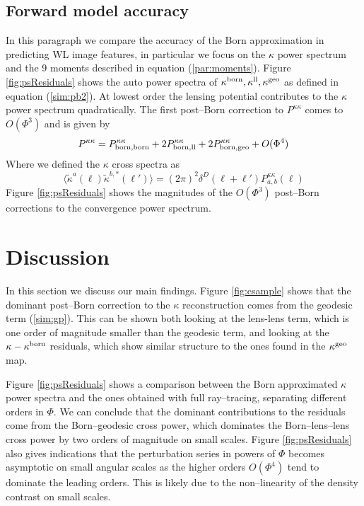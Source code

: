\documentclass[reprint,aps,prd,superscriptaddress,showkeys,showpacs]{revtex4-1}
\begin{document}
\subsection{Forward model accuracy}

In this paragraph we compare the accuracy of the Born approximation in predicting WL image features, in particular we focus on the $\kappa$ power spectrum and the 9 moments described in equation (\ref{par:moments}). Figure \ref{fig:psResiduals} shows the auto power spectra of $\kappa^{\rm born},\kappa^{\rm ll},\kappa^{\rm geo}$ as defined in equation (\ref{sim:pb2}). At lowest order the lensing potential contributes to the $\kappa$ power spectrum quadratically. The first post--Born correction to $P^{\kappa\kappa}$ comes to $O(\Phi^3)$ and is given by
\begin{equation}
\label{res:powercorr}
P^{\kappa\kappa} = P^{\kappa\kappa}_{\rm born,born} + 2P^{\kappa\kappa}_{\rm born,ll} + 2P^{\kappa\kappa}_{\rm born,geo} + O(\Phi^4)
\end{equation}
%
Where we defined the $\kappa$ cross spectra as
\begin{equation}
\label{res:powercross}
\langle\tilde{\kappa}^{a}(\pmb{\ell})\tilde{\kappa}^{b,*}(\pmb{\ell}')\rangle = (2\pi)^2\delta^D(\pmb{\ell}+\pmb{\ell}')P_{a,b}^{\kappa\kappa}(\ell)
\end{equation} 
%
Figure \ref{fig:psResiduals} shows the magnitudes of the $O(\Phi^3)$ post--Born corrections to the convergence power spectrum. 


\section{Discussion}
% 
In this section we discuss our main findings. Figure \ref{fig:csample} shows that the dominant post--Born correction to the $\kappa$ reconstruction comes from the geodesic term (\ref{sim:gp}). This can be shown both looking at the lens-lens term, which is one order of magnitude smaller than the geodesic term, and looking at the $\kappa-\kappa^{\rm born}$ residuals, which show similar structure to the ones found in the $\kappa^{\rm geo}$ map. 

Figure \ref{fig:psResiduals} shows a comparison between the Born approximated $\kappa$ power spectra and the ones obtained with full ray--tracing, separating different orders in $\Phi$. We can conclude that the dominant contributions to the residuals come from the Born--geodesic cross power, which dominates the Born--lens--lens cross power by two orders of magnitude on small scales. Figure \ref{fig:psResiduals} also gives indications that the perturbation series in powers of $\Phi$ becomes asymptotic on small angular scales as the higher orders $O(\Phi^4)$ tend to dominate the leading orders. This is likely due to the non--linearity of the density contrast on small scales. 
\end{document}
